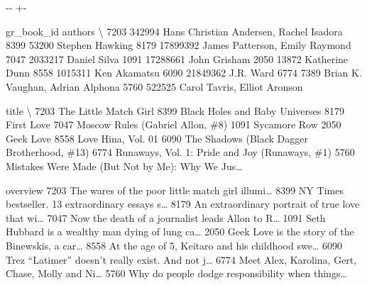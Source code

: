 \documentclass[letterpaper,10pt,english]{sphinxmanual}
\newlength\nbsphinxcodecellspacing
\begin{document}
{

\kern-\sphinxverbatimsmallskipamount\kern-\baselineskip
\kern+\FrameHeightAdjust\kern-\fboxrule
\vspace{\nbsphinxcodecellspacing}

\begin{sphinxVerbatim}[commandchars=\\\{\}]
\llap{\color{nbsphinxout}[20]:\,\hspace{\fboxrule}\hspace{\fboxsep}}      gr\_book\_id                                  authors  \textbackslash{}
7203      342994  Hans Christian Andersen, Rachel Isadora
8399       53200                          Stephen Hawking
8179    17899392           James Patterson, Emily Raymond
7047     2033217                             Daniel Silva
1091    17288661                             John Grisham
2050       13872                           Katherine Dunn
8558     1015311                             Ken Akamatsu
6090    21849362                                J.R. Ward
6774        7389         Brian K. Vaughan, Adrian Alphona
5760      522525             Carol Tavris, Elliot Aronson

                                                  title  \textbackslash{}
7203                              The Little Match Girl
8399                     Black Holes and Baby Universes
8179                                         First Love
7047                   Moscow Rules (Gabriel Allon, \#8)
1091                                       Sycamore Row
2050                                          Geek Love
8558                                 Love Hina, Vol. 01
6090        The Shadows (Black Dagger Brotherhood, \#13)
6774     Runaways, Vol. 1: Pride and Joy (Runaways, \#1)
5760  Mistakes Were Made (But Not by Me): Why We Jus{\ldots}

                                               overview
7203  The wares of the poor little match girl illumi{\ldots}
8399  NY Times bestseller. 13 extraordinary essays s{\ldots}
8179  An extraordinary portrait of true love that wi{\ldots}
7047  Now the death of a journalist leads Allon to R{\ldots}
1091  Seth Hubbard is a wealthy man dying of lung ca{\ldots}
2050  Geek Love is the story of the Binewskis, a car{\ldots}
8558  At the age of 5, Keitaro and his childhood swe{\ldots}
6090  Trez “Latimer” doesn’t really exist. And not j{\ldots}
6774  Meet Alex, Karolina, Gert, Chase, Molly and Ni{\ldots}
5760  Why do people dodge responsibility when things{\ldots}
\end{sphinxVerbatim}
}
\end{document}

